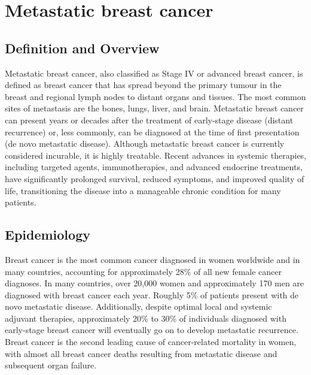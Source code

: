 \chapter{Metastatic breast cancer}

\section*{Definition and Overview}
Metastatic breast cancer, also classified as Stage IV or advanced breast cancer, is defined as breast cancer that has spread beyond the primary tumour in the breast and regional lymph nodes to distant organs and tissues. The most common sites of metastasis are the bones, lungs, liver, and brain. Metastatic breast cancer can present years or decades after the treatment of early-stage disease (distant recurrence) or, less commonly, can be diagnosed at the time of first presentation (de novo metastatic disease). Although metastatic breast cancer is currently considered incurable, it is highly treatable. Recent advances in systemic therapies, including targeted agents, immunotherapies, and advanced endocrine treatments, have significantly prolonged survival, reduced symptoms, and improved quality of life, transitioning the disease into a manageable chronic condition for many patients.

\section*{Epidemiology}
Breast cancer is the most common cancer diagnosed in women worldwide and in many countries, accounting for approximately 28\% of all new female cancer diagnoses. In many countries, over 20,000 women and approximately 170 men are diagnosed with breast cancer each year. Roughly 5\% of patients present with de novo metastatic disease. Additionally, despite optimal local and systemic adjuvant therapies, approximately 20\% to 30\% of individuals diagnosed with early-stage breast cancer will eventually go on to develop metastatic recurrence. Breast cancer is the second leading cause of cancer-related mortality in women, with almost all breast cancer deaths resulting from metastatic disease and subsequent organ failure.

